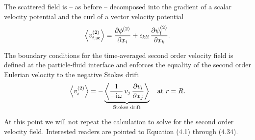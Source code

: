 The scattered field is -- as before -- decomposed into the gradient of a scalar 
velocity potential and the curl of a vector velocity potential
\begin{equation}
  \left\langle v_{i,\mathrm{sc}}^{(2)} \right\rangle =
  \pdv{  \phi^{(2)}  }{x_{i}} + 
  \epsilon_{kli}\,\pdv{  \psi^{(2)}  _{l}}{x_{k}}.
  \label{eq:TA-nd-sc-decomposition}
\end{equation}

The boundary conditions for the time-averaged second order velocity field is 
defined at the particle-fluid interface and enforces the equality of the second 
order Eulerian velocity to the negative Stokes drift
\begin{equation}
  \left\langle v_{i}^{(2)} \right\rangle
  =
  -
  \underbrace{
    \left\langle \frac{1}{-\mathrm{i}\mkern1mu\omega}\,v_{j}\,\pdv{v_{i}}{x_{j}} \right\rangle
  }_{\text{Stokes drift}}
  \quad\text{at~}r=R.
  \label{eq:TA-nd-BCs}
\end{equation}


At this point we will not repeat the calculation to solve for the second order 
velocity field. Interested readers are pointed to  
Equation (4.1) through (4.34).


